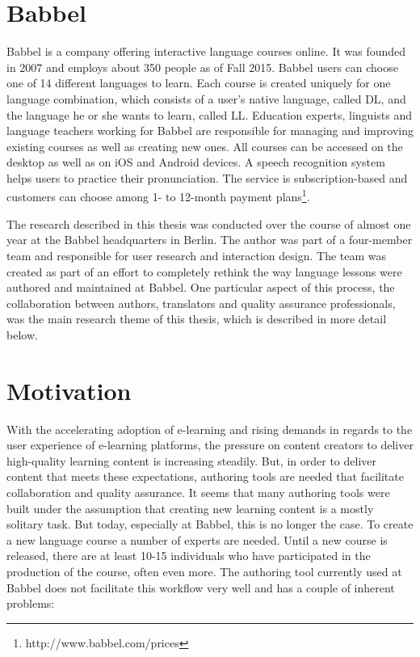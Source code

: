 \section{Babbel}
Babbel is a company offering interactive language courses online. It was founded in 2007 and employs about 350 people as of Fall 2015. Babbel users can choose one of 14 different languages to learn. Each course is created uniquely for one language combination, which consists of a user's native language, called \ac{DL}, and the language he or she wants to learn, called \ac{LL}. Education experts, linguists and language teachers working for Babbel are responsible for managing and improving existing courses as well as creating new ones. All courses can be accessed on the desktop as well as on iOS and Android devices. A speech recognition system helps users to practice their pronunciation. The service is subscription-based and customers can choose among 1- to 12-month payment plans\footnote{http://www.babbel.com/prices}.

The research described in this thesis was conducted over the course of almost one year at the Babbel headquarters in Berlin. The author was part of a four-member team and responsible for user research and interaction design. The team was created as part of an effort to completely rethink the way language lessons were authored and maintained at Babbel. One particular aspect of this process, the collaboration between authors, translators and quality assurance professionals, was the main research theme of this thesis, which is described in more detail below.

\section{Motivation} %
With the accelerating adoption of e-learning and rising demands in regards to the user experience of e-learning platforms, the pressure on content creators to deliver high-quality learning content is increasing steadily. But, in order to deliver content that meets these expectations, authoring tools are needed that facilitate collaboration and quality assurance. It seems that many authoring tools were built under the assumption that creating new learning content is a mostly solitary task. But today, especially at Babbel, this is no longer the case. To create a new language course a number of experts are needed. Until a new course is released, there are at least 10-15 individuals who have participated in the production of the course, often even more. The authoring tool currently used at Babbel does not facilitate this workflow very well and has a couple of inherent problems:

